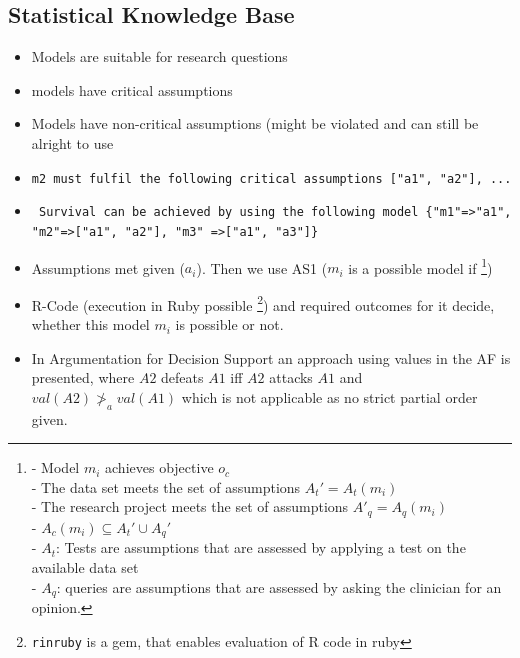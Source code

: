 \subsection{Statistical Knowledge Base}
\begin{itemize}
	\item Models are suitable for research questions
	\item models have critical assumptions
	\item Models have non-critical assumptions (might be violated and can still be alright to use
	\item \texttt{m2 must fulfil the following critical assumptions ["a1", "a2"], ... }
	\item \texttt{ Survival can be achieved by using the following model \{"m1"=>"a1", "m2"=>["a1", "a2"], "m3" =>["a1", "a3"]\}}
	\item Assumptions met given ($a_i$). Then we use AS1 ($m_i$ is a possible model if 
			\footnote{
				- Model $m_i$ achieves objective $o_c$\\
				- The data set meets the set of assumptions $A_t' = A_t (m_i)$\\
				- The research project meets the set of assumptions $A'_q = A_q (m_i)$\\
				- $A_c(m_i) \subseteq A_t' \cup A_q'$\\
				- $A_t$: Tests are assumptions that are assessed by applying a test on the available data set \\
				- $A_q$: queries are assumptions that are assessed by asking the clinician for an opinion.
			})
	\item R-Code (execution in Ruby possible \cite{rinRuby}   \footnote{\texttt{rinruby} is a gem, that enables evaluation of R code in ruby}) and required outcomes for it decide, whether this model $m_i$ is possible or not. 
	\item In Argumentation for Decision Support\cite{Atkinson2006} an approach using values in the AF is presented, where $A2$ defeats $A1$ iff $A2$ attacks $A1$ and $val(A2) \ngtr_a val(A1)$ which is not applicable as no strict partial order given.
\end{itemize}

